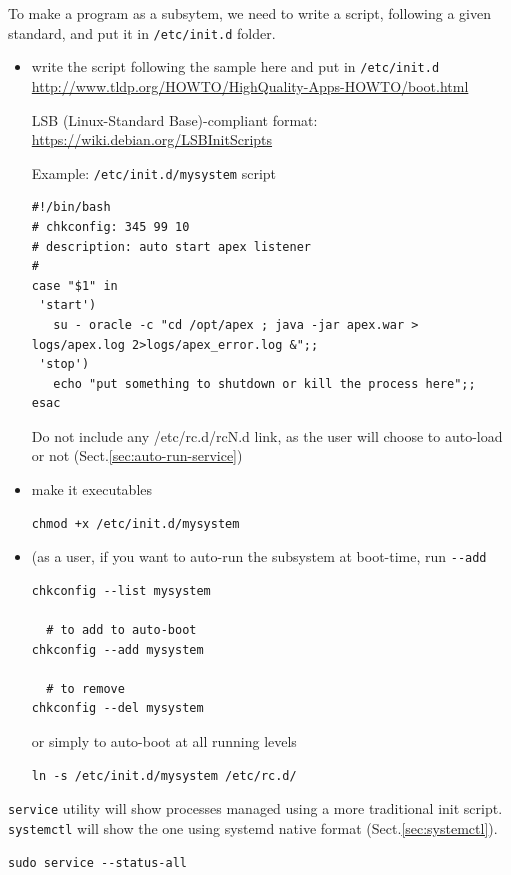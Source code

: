To make a program as a subsytem, we need to write a script, following a given
standard, and put it in \verb!/etc/init.d! folder.
\begin{itemize}
  \item write the script following the sample here
  and put in \verb!/etc/init.d!
\url{http://www.tldp.org/HOWTO/HighQuality-Apps-HOWTO/boot.html}
  
 LSB (Linux-Standard Base)-compliant format: 
 \url{https://wiki.debian.org/LSBInitScripts}

Example: \verb!/etc/init.d/mysystem! script
\begin{verbatim}
#!/bin/bash
# chkconfig: 345 99 10
# description: auto start apex listener
#
case "$1" in
 'start')
   su - oracle -c "cd /opt/apex ; java -jar apex.war > logs/apex.log 2>logs/apex_error.log &";;
 'stop')
   echo "put something to shutdown or kill the process here";;
esac
\end{verbatim}
 
  Do not include any /etc/rc.d/rcN.d link, as the user will choose to auto-load
  or not (Sect.\ref{sec:auto-run-service})
  
  \item make it executables
\begin{verbatim}
chmod +x /etc/init.d/mysystem
\end{verbatim} 


  \item (as a user, if you want to auto-run the subsystem at boot-time, 
  run \verb!--add! 
\begin{verbatim}
chkconfig --list mysystem

  # to add to auto-boot
chkconfig --add mysystem

  # to remove
chkconfig --del mysystem
\end{verbatim}

or simply to auto-boot at all running levels
\begin{verbatim}
ln -s /etc/init.d/mysystem /etc/rc.d/
\end{verbatim}

\end{itemize}

\verb!service! utility will show processes managed using a more traditional init
script. \verb!systemctl! will show the one using systemd native format
(Sect.\ref{sec:systemctl}).
\begin{verbatim}
sudo service --status-all
\end{verbatim}

